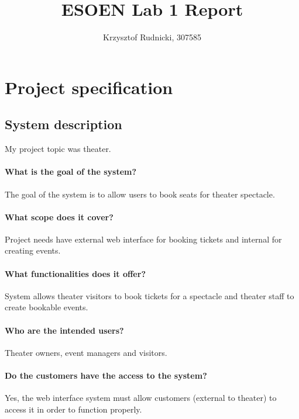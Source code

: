 \documentclass[12pt]{article}
\title{ESOEN Lab 1 Report}
\author{Krzysztof Rudnicki, 307585}
\begin{document}
\maketitle
\section{Project specification}

\subsection{System description}
My project topic was theater.
\paragraph{What is the goal of the system?}
The goal of the system is to allow users to book seats for theater spectacle.
\paragraph{What scope does it cover?}
Project needs have external web interface for booking tickets and internal for creating events. 
\paragraph{What functionalities does it offer?}
System allows theater visitors to book tickets for a spectacle and theater staff to create bookable events.
\paragraph{Who are the intended users?}
Theater owners, event managers and visitors. 
\paragraph{Do the customers have the access to the system?}
Yes, the web interface system must allow customers (external to theater) to access it in order to function properly.
\end{document}
